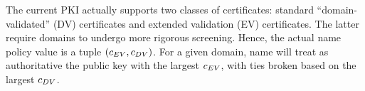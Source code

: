 The current PKI actually supports two classes of certificates: 
standard ``domain-validated'' (DV) certificates
and
extended validation (EV) certificates.
The latter require domains to undergo more rigorous screening.
Hence, the actual \ac{name} policy value is a tuple $(c_{EV}, c_{DV})$.
For a given domain, \ac{name} will treat as authoritative the public
key with the largest $c_{EV}$, with ties broken based on the largest $c_{DV}$.





